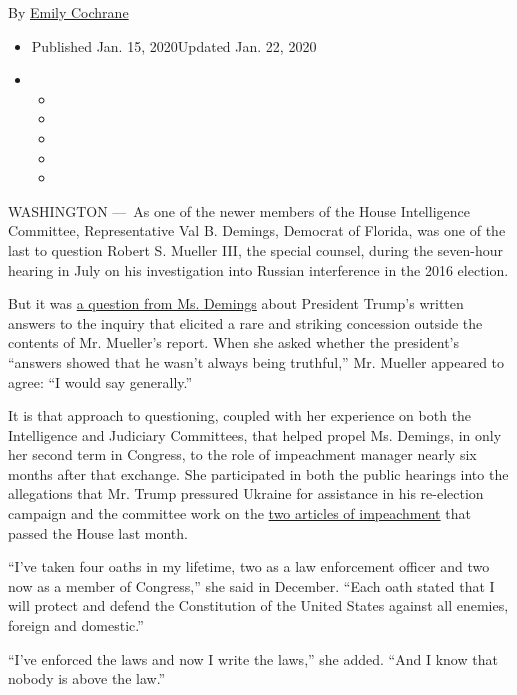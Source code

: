 By \href{https://www.nytimes3xbfgragh.onion/by/emily-cochrane}{Emily
Cochrane}

\begin{itemize}
\item
  Published Jan. 15, 2020Updated Jan. 22, 2020
\item
  \begin{itemize}
  \item
  \item
  \item
  \item
  \item
  \end{itemize}
\end{itemize}

WASHINGTON ---~As one of the newer members of the House Intelligence
Committee, Representative Val B. Demings, Democrat of Florida, was one
of the last to question Robert S. Mueller III, the special counsel,
during the seven-hour hearing in July on his investigation into Russian
interference in the 2016 election.

But it was
\href{https://www.nytimes3xbfgragh.onion/2019/07/25/us/politics/trump-written-answers-mueller.html?searchResultPosition=1}{a
question from Ms. Demings} about President Trump's written answers to
the inquiry that elicited a rare and striking concession outside the
contents of Mr. Mueller's report. When she asked whether the president's
``answers showed that he wasn't always being truthful,'' Mr. Mueller
appeared to agree: ``I would say generally.''

It is that approach to questioning, coupled with her experience on both
the Intelligence and Judiciary Committees, that helped propel Ms.
Demings, in only her second term in Congress, to the role of impeachment
manager nearly six months after that exchange. She participated in both
the public hearings into the allegations that Mr. Trump pressured
Ukraine for assistance in his re-election campaign and the committee
work on the
\href{https://www.nytimes3xbfgragh.onion/2019/12/18/us/politics/trump-impeached.html}{two
articles of impeachment} that passed the House last month.

``I've taken four oaths in my lifetime, two as a law enforcement officer
and two now as a member of Congress,'' she said in December. ``Each oath
stated that I will protect and defend the Constitution of the United
States against all enemies, foreign and domestic.''

``I've enforced the laws and now I write the laws,'' she added. ``And I
know that nobody is above the law.''

